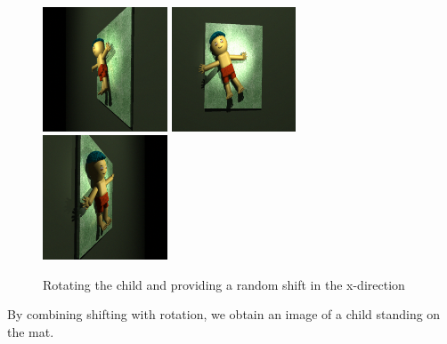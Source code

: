 \documentclass{article}
\begin{document}
\begin{figure}[htbp]
    \centering
    \includegraphics[height=3.7cm]{plots/child_000000_rgb_030a.png}
    \includegraphics[height=3.7cm]{plots/child_000000_rgb_090a.png}
    \includegraphics[height=3.7cm]{plots/child_000000_rgb_150a.png}
    \caption{Rotating the child and providing a random shift in the x-direction}
    \label{fig:rotation}
\end{figure}

By combining shifting with rotation, we obtain an image of a child standing on the mat.
\end{document}
